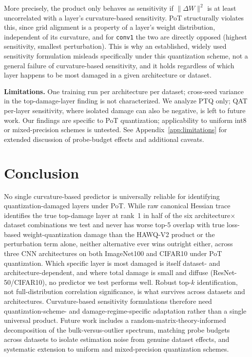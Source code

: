 \documentclass{article}
\begin{document}
More precisely, the product only behaves as sensitivity if $\|\Delta W\|^2$ is at least uncorrelated with a layer's curvature-based sensitivity. PoT structurally violates this, since grid alignment is a property of a layer's weight distribution, independent of its curvature, and for \texttt{conv1} the two are directly opposed (highest sensitivity, smallest perturbation). This is why an established, widely used sensitivity formulation misleads specifically under this quantization scheme, not a general failure of curvature-based sensitivity, and it holds regardless of which layer happens to be most damaged in a given architecture or dataset.

\textbf{Limitations.} One training run per architecture per dataset; cross-seed variance in the top-damage-layer finding is not characterized. We analyze PTQ only; QAT per-layer sensitivity, where isolated damage can also be negative, is left to future work. Our findings are specific to PoT quantization; applicability to uniform int8 or mixed-precision schemes is untested. %
See Appendix~\ref{app:limitations} for extended discussion of probe-budget effects and additional caveats.

\section{Conclusion}
No single curvature-based predictor is universally reliable for identifying quantization-damaged layers under PoT. While raw canonical Hessian trace identifies the true top-damage layer at rank~1 in half of the six architecture$\times$dataset combinations we test and never has worse top-5 overlap with true loss-based weight-quantization damage than the HAWQ-V2 product or the perturbation term alone, neither alternative ever wins outright either, across three CNN architectures on both ImageNet100 and CIFAR10 under PoT quantization. Which specific layer is most damaged is itself dataset- and architecture-dependent, and where total damage is small and diffuse (ResNet-50/CIFAR10), no predictor we test performs well. Robust top-$k$ identification, not full-distribution correlation significance, is what survives across datasets and architectures. Curvature-based sensitivity formulations therefore need quantization-scheme- and damage-regime-specific adaptation rather than a single universal product. Future work includes a random-matrix-theory-informed decomposition of the bulk-versus-outlier spectrum, matching probe budgets across datasets to isolate estimation noise from genuine dataset effects, and systematic extension to uniform and mixed-precision quantization schemes.
\end{document}
